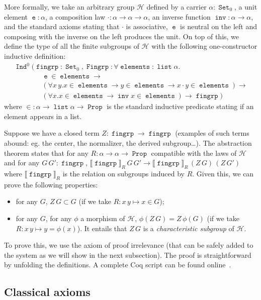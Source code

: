 \documentclass[a4paper,USenglish]{lipics}
\DeclareMathOperator{\Prop}{\mathtt{Prop}}
\DeclareMathOperator{\Set}{\mathtt{Set}}
\DeclareMathOperator{\Ind}{\mathtt{Ind}}
\DeclareMathOperator{\List}{\mathtt{list}}
\DeclareMathOperator{\inv}{\mathtt{inv}}
\DeclareMathOperator{\e}{\mathtt{e}}
\DeclareMathOperator{\fingrp}{\mathtt{fingrp}}
\DeclareMathOperator{\Fingrp}{\mathtt{Fingrp}}
\DeclareMathOperator{\elements}{\mathtt{elements}}
\def\coq{\textsf{Coq}\xspace}
\begin{document}
More formally, we take an arbitrary group $\mathcal{H}$ defined by a
carrier $\alpha : \Set_0$, a unit element $\e : \alpha$, a composition
law $\cdot : \alpha → \alpha → \alpha$, an inverse function $\inv :
\alpha → \alpha$, and the standard axioms stating that $\cdot$ is
associative, $\e$ is neutral on the left and composing with the inverse
on the left produces the unit. On top of this, we define the type of all
the finite subgroups of $\mathcal{H}$ with the following one-constructor
inductive definition:
\begin{equation*} \begin{array}{l}
\Ind^0 \Big(\fingrp : \Set_0, \Fingrp : ∀ \elements: \List \alpha. \\
\qquad \qquad \e ∈ \elements →\\
\qquad \qquad (∀ x\,y. x ∈ \elements → y ∈ \elements → x \cdot y ∈ \elements) → \\
\qquad \qquad (∀ x. x ∈ \elements → \inv x ∈ \elements) → \fingrp\Big)
\end{array}
\end{equation*}
where $∈ : \alpha → \List \alpha → \Prop$ is the standard inductive
predicate stating if an element appears in a list.

Suppose we have a closed term $Z : \fingrp → \fingrp$ (examples of such
terms abound: eg. the center, the normalizer, the derived
subgroup\dots). The abstraction
theorem states that for any $R : \alpha → \alpha → \Prop$ compatible
with the laws of $\mathcal{H}$ and for any $G\,G' : \fingrp$, $⟦\fingrp⟧_R\,G
\,G' → ⟦\fingrp⟧_R\,(Z\,G)\,(Z\,G')$ where $⟦\fingrp⟧_R$ is the relation
on subgroups induced by $R$. Given this, we can prove the following
properties:
\begin{itemize}
\item for any $G$, $Z\,G \subset G$ (if we take $R : x\,y \mapsto x \in G$);
\item for any $G$, for any $\phi$ a morphism of $\mathcal{H}$,
  $\phi(Z\,G) = Z\,\phi(G)$ (if we take $R : x\,y \mapsto y = \phi(x)$).
  It entails that $Z\,G$ is a \emph{characteristic subgroup} of
  $\mathcal{H}$.
\end{itemize}
To prove this, we use the axiom of proof irrelevance (that can be safely
added to the system as we will show in the next subsection). The proof
is straightforward by unfolding the definitions. A complete \coq script
can be found online~\cite{implem12}.


\subsection{Classical axioms}\label{sec:examples:axioms}
\end{document}
